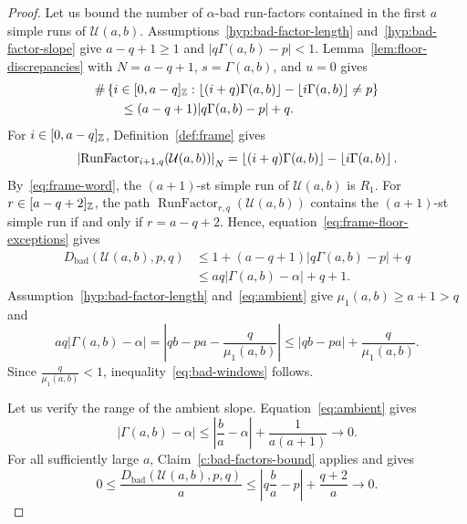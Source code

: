 \begin{proof}
 Let us bound the number of $\alpha$-bad run-factors contained in the first $a$ simple runs of $\mathcal U(a,b)$.
Assumptions~\ref{hyp:bad-factor-length} and~\ref{hyp:bad-factor-slope} give $a-q+1\ge1$ and $|q\Gamma(a,b)-p|<1$.
Lemma~\ref{lem:floor-discrepancies} with $N=a-q+1$, $s=\Gamma(a,b)$, and $u=0$ gives
\begin{equation}\label{eq:frame-floor-exceptions}
\begin{aligned}
 &\#\left\{i\in[0,a-q]_{\mathbb Z}:\left\lfloor(i+q)\Gamma(a,b)\right\rfloor-\left\lfloor i\Gamma(a,b)\right\rfloor\ne p\right\}\\
 &\qquad\le(a-q+1)|q\Gamma(a,b)-p|+q.
\end{aligned}
\end{equation}
For $i\in[0,a-q]_{\mathbb Z}$, Definition~\ref{def:frame} gives
\[
 \left|\operatorname{RunFactor}_{i+1,q}(\mathcal U(a,b))\right|_N
 =\left\lfloor(i+q)\Gamma(a,b)\right\rfloor-\left\lfloor i\Gamma(a,b)\right\rfloor.
\]
By~\eqref{eq:frame-word}, the $(a+1)$-st simple run of $\mathcal U(a,b)$ is $R_1$.
For $r\in[a-q+2]_{\mathbb Z}$, the path $\operatorname{RunFactor}_{r,q}(\mathcal U(a,b))$
contains the $(a+1)$-st simple run if and only if $r=a-q+2$.
Hence, equation~\eqref{eq:frame-floor-exceptions} gives
\[
\begin{aligned}
 D_{\mathrm{bad}}(\mathcal U(a,b),p,q)
 &\le 1+(a-q+1)|q\Gamma(a,b)-p|+q\\
 &\le aq|\Gamma(a,b)-\alpha|+q+1.
\end{aligned}
\]
Assumption~\ref{hyp:bad-factor-length} and~\eqref{eq:ambient} give $\mu_1(a,b)\ge a+1>q$ and
\[
 aq|\Gamma(a,b)-\alpha|
 =\left|qb-pa-\frac q{\mu_1(a,b)}\right|
 \le |qb-pa|+\frac q{\mu_1(a,b)}.
\]
Since $\frac q{\mu_1(a,b)}<1$, inequality~\eqref{eq:bad-windows} follows.

 Let us verify the range of the ambient slope.
Equation~\eqref{eq:ambient} gives
\[
 |\Gamma(a,b)-\alpha|\le\left|\frac ba-\alpha\right|+\frac1{a(a+1)}\longrightarrow0.
\]
For all sufficiently large $a$, Claim~\ref{c:bad-factors-bound} applies and gives
\[
 0\le\frac{D_{\mathrm{bad}}(\mathcal U(a,b),p,q)}a
 \le\left|q\frac ba-p\right|+\frac{q+2}a\longrightarrow0.
\]
\end{proof}

